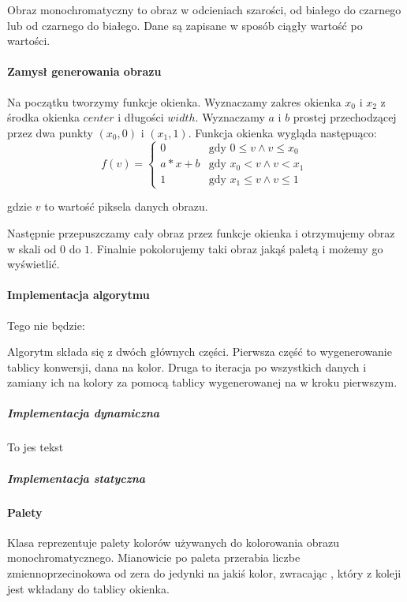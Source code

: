 
Obraz monochromatyczny to obraz w odcieniach szarości, od białego do czarnego lub od czarnego do białego. Dane są zapisane w sposób ciągły wartość po wartości.

\paragraph{Zamysł generowania obrazu}

Na początku tworzymy funkcje okienka.
Wyznaczamy zakres okienka $x_0$ i $x_2$ z środka okienka $center$ i długości $width$.
Wyznaczamy $a$ i $b$ prostej przechodzącej przez dwa punkty $(x_0, 0)$ i $(x_1, 1)$.
Funkcja okienka wygląda następuąco:
\[
    f(v)=
    \begin{cases}
    0     & \text{gdy $0 \le v \wedge v \le x_0$ }\\
    a*x+b & \text{gdy $x_0 < v \wedge v < x_1$}\\
    1     & \text{gdy $x_1 \le v \wedge v \le 1$ } 
    \end{cases}
\]

gdzie $v$ to wartość piksela danych obrazu.

Następnie przepuszczamy cały obraz przez funkcje okienka i otrzymujemy obraz w skali od $0$ do $1$.
Finalnie pokolorujemy taki obraz jakąś paletą i możemy go wyświetlić.


\paragraph{Implementacja algorytmu}

Tego nie będzie:

Algorytm składa się z dwóch głównych części.
Pierwsza część to wygenerowanie tablicy konwersji, dana na kolor.
Druga to iteracja po wszystkich danych i zamiany ich na kolory za pomocą tablicy wygenerowanej na w kroku pierwszym.

\subparagraph{Implementacja dynamiczna}

To jes tekst

\subparagraph{Implementacja statyczna}

\paragraph{Palety} 
Klasa  reprezentuje palety kolorów używanych do kolorowania obrazu monochromatycznego.
Mianowicie po paleta przerabia liczbe zmiennoprzecinokowa od zera do jedynki na jakiś kolor, zwracając , który z koleji jest wkładany do tablicy okienka.


